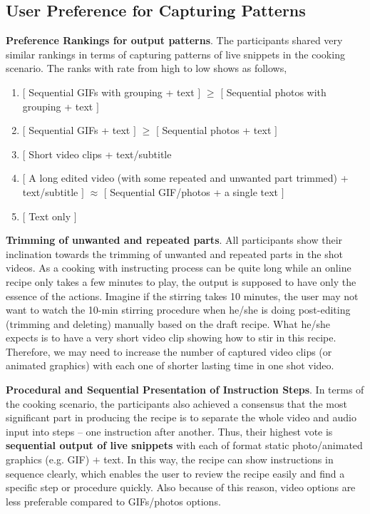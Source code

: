\documentclass[fyp]{socreport}
\begin{document}
\subsection{User Preference for Capturing Patterns}

\textbf{Preference Rankings for output patterns}. The participants shared very similar rankings in terms of capturing patterns of live snippets in the cooking scenario. The ranks with rate from high to low shows as follows,

\begin{enumerate}
    \item $[$ Sequential GIFs with grouping + text $]$ $\geq$ $[$ Sequential photos with grouping + text $]$
    \item $[$ Sequential GIFs + text $]$ $\geq$ $[$ Sequential photos + text $]$
    \item $[$ Short video clips + text/subtitle
    \item $[$ A long edited video (with some repeated and unwanted part trimmed) +  text/subtitle $]$ $\approx$ $[$ Sequential GIF/photos + a single text $]$
    \item $[$ Text only $]$
\end{enumerate}

\textbf{Trimming of unwanted and repeated parts}. All participants show their inclination towards the trimming of unwanted and repeated parts in the shot videos. As a cooking with instructing process can be quite long while an online recipe only takes a few minutes to play, the output is supposed to have only the essence of the actions. Imagine if the stirring takes 10 minutes, the user may not want to watch the 10-min stirring procedure when he/she is doing post-editing (trimming and deleting) manually based on the draft recipe. What he/she expects is to have a very short video clip showing how to stir in this recipe. Therefore, we may need to increase the number of captured video clips (or animated graphics) with each one of shorter lasting time in one shot video.

\textbf{Procedural and Sequential Presentation of Instruction Steps}. In terms of the cooking scenario, the participants also achieved a consensus that the most significant part in producing the recipe is to separate the whole video and audio input into steps -- one instruction after another. Thus, their highest vote is \textbf{sequential output of live snippets} with each of format static photo/animated graphics (e.g. GIF) $+$ text. In this way, the recipe can show instructions in sequence clearly, which enables the user to review the recipe easily and find a specific step or procedure quickly. Also because of this reason, video options are less preferable compared to GIFs/photos options.
\end{document}
